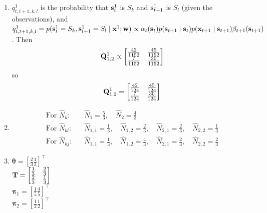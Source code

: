 \documentclass[12pt]{article}
\begin{document}
\begin{solution}
\begin{enumerate}
	\item $q^1_{t,t+1,k,l}$ is the probability that $\mathbf{s}^1_t$ is $S_k$ and $\mathbf{s}^1_{t+1}$ is $S_l$ (given the observations), and $q^1_{t,t+1,k,l} = p(\mathbf{s}^1_t = S_k, \mathbf{s}^1_{t+1} = S_l \mid \mathbf{x}^1; \mathbf{w}) \propto \alpha_t(\mathbf{s}_t) p(\mathbf{s}_{t+1} \mid \mathbf{s}_t) p(\mathbf{x}_{t+1} \mid \mathbf{s}_{t+1}) \beta_{t+1}(\mathbf{s}_{t+1})$. Then 
	\[\mathbf{Q}^1_{1,2} \propto \begin{bmatrix} \frac{42}{1152} & \frac{45}{1152} \\ \frac{7}{1152} & \frac{30}{1152} \end{bmatrix}\]
	so 
	\[\mathbf{Q}^1_{1,2} = \begin{bmatrix} \frac{42}{124} & \frac{45}{124} \\ \frac{7}{124} & \frac{30}{124} \end{bmatrix}\]
	\item 
	\begin{align*}
	\text{For $\hat{N}_k$:}& \quad \hat{N}_1 = \frac{5}{3}, \quad \hat{N}_2 = \frac{4}{3}\\
	\text{For $\hat{N}_{kl}$:}& \quad \hat{N}_{1,1} = \frac{1}{3}, \quad \hat{N}_{1,2} = \frac{2}{3}, \quad \hat{N}_{2,1} = \frac{2}{3}, \quad \hat{N}_{2,2} = \frac{1}{3}\\
	\text{For $\hat{N}_{kj}$:}& \quad \hat{N}_{1,1} = \frac{1}{3}, \quad \hat{N}_{1,2} = \frac{4}{3}, \quad \hat{N}_{2,1} = \frac{2}{3}, \quad \hat{N}_{2,2} = \frac{2}{3}
	\end{align*}
	\item
	$\boldsymbol{\theta} = [\frac{2}{3} \frac{1}{3}]^\top$\\
	$\mathbf{T} = \begin{bmatrix} \frac{1}{3} & \frac{2}{3} \\ \frac{2}{3} & \frac{1}{3} \end{bmatrix}$\\
	$\boldsymbol{\pi}_1 = [\frac{1}{5} \frac{4}{5}]^\top$\\
	$\boldsymbol{\pi}_2 = [\frac{1}{2} \frac{1}{2}]^\top$
	
\end{enumerate}
\end{solution}
\end{document}
